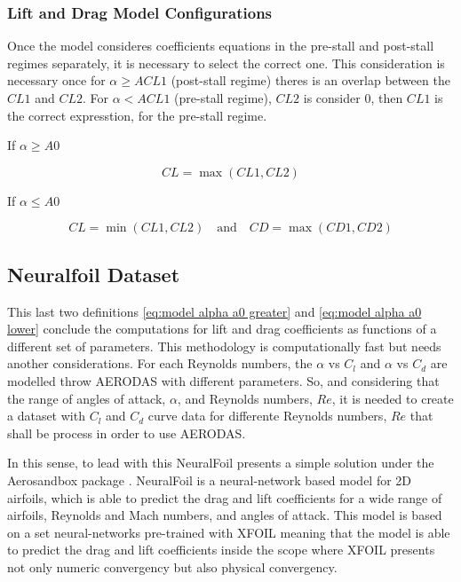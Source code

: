 \subsubsection{Lift and Drag Model Configurations}

Once the model consideres coefficients equations in the pre-stall and post-stall regimes separately, it is necessary to select the correct one. This consideration is necessary once for $\alpha \geq ACL1$ (post-stall regime) theres is an overlap between the $CL1$ and $CL2$. For $\alpha < ACL1$ (pre-stall regime), $CL2$ is consider 0, then $CL1$ is the correct expresstion, for the pre-stall regime.

If $\alpha \geq A0$

\begin{equation}
    C L=\operatorname*{max}(CL1, CL2)
    \label{eq:model alpha a0 greater}    
\end{equation}

If $\alpha \leq A0$

\begin{equation}
    CL = \operatorname*{min}(CL1 , CL2) \quad \text{and} \quad CD = \operatorname*{max}(CD1, CD2)
    \label{eq:model alpha a0 lower}
\end{equation}

\subsection{Neuralfoil Dataset}

This last two definitions \ref{eq:model alpha a0 greater} and \ref{eq:model alpha a0 lower} conclude the computations for lift and drag coefficients as functions of a different set of parameters. This methodology is computationally fast but needs another considerations. For each Reynolds numbers, the $\alpha$ vs $C_l$ and $\alpha$ vs $C_d$ are modelled throw AERODAS with different parameters. So, and considering that the range of angles of attack, $\alpha$, and Reynolds numbers, $Re$, it is needed to create a dataset with $C_l$ and $C_d$ curve data for differente Reynolds numbers, $Re$ that shall be process in order to use AERODAS.

In this sense, to lead with this NeuralFoil \cite{sharpe_neuralfoil_nodate} presents a simple solution under the Aerosandbox package \cite{sharpe_aerosandbox_nodate,sharpe_accelerating_nodate}. NeuralFoil is a neural-network based model for 2D airfoils, which is able to predict the drag and lift coefficients for a wide range of airfoils, Reynolds and Mach numbers, and angles of attack. This model is based on a set neural-networks pre-trained with XFOIL meaning that the model is able to predict the drag and lift coefficients inside the scope where XFOIL presents not only numeric convergency but also physical convergency. 

